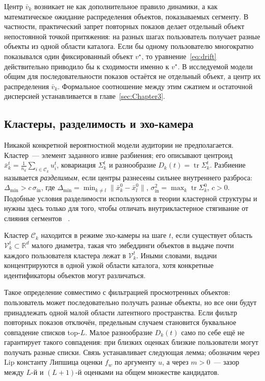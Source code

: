 Центр $\bar v_k$ возникает не как дополнительное правило динамики, а как
математическое ожидание распределения объектов, показываемых сегменту. В
частности, практический запрет повторных показов делает отдельный объект
непостоянной точкой притяжения: на разных шагах пользователь получает разные
объекты из одной области каталога. Если бы одному пользователю многократно
показывался один фиксированный объект $v^\star$, то
уравнение~\eqref{eq:drift} действительно приводило бы к сходимости именно к
$v^\star$. В исследуемой модели общим для последовательности показов остаётся
не отдельный объект, а центр их распределения $\bar v_k$. Формальное соотношение
между этим сжатием и остаточной дисперсией устанавливается в
главе~\ref{sec:Chapter3}.

\subsection{Кластеры, разделимость и эхо-камера}
\label{subsec:clusters}

Никакой конкретной вероятностной модели аудитории не предполагается. Кластер~---
элемент заданного извне разбиения; его описывают центроид
$\bar x_k^t=\tfrac1{n_k}\sum_{i\in\mathcal C_k}u_i^t$, ковариация $\Sigma_k^t$ и
разнообразие $D_k(t)=\operatorname{tr}\Sigma_k^t$. Разбиение называется
\emph{разделимым}, если центры разнесены сильнее внутреннего разброса:
$\Delta_{\min}>c\,\sigma_{\mathrm{in}}$, где
$\Delta_{\min}=\min_{k\ne l}\lVert\bar x_k^0-\bar x_l^0\rVert$,
$\sigma_{\mathrm{in}}^2=\max_k\operatorname{tr}\Sigma_k^0$, $c>0$. Подобные
условия разделимости используются в теории кластерной структуры и нужны здесь
только для того, чтобы отличать внутрикластерное стягивание от слияния сегментов
~\cite{hartigan1981, chaudhuri2010}.

\begin{definition}
\label{def:echo}
Кластер $\mathcal C_k$ находится в режиме эхо-камеры на шаге $t$, если существует
область $\mathcal V_k^t\subset\mathbb R^d$ малого диаметра, такая что эмбеддинги
объектов в выдаче почти каждого пользователя кластера лежат в
$\mathcal V_k^t$. Иными словами, выдачи концентрируются в одной узкой области
каталога, хотя конкретные идентификаторы объектов могут различаться.
\end{definition}

Такое определение совместимо с фильтрацией просмотренных объектов:
пользователь может последовательно получать разные объекты, но все они будут
принадлежать одной малой области латентного пространства. Если фильтр повторных
показов отключён, предельным случаем становится буквальное совпадение списков
top-$L$. Малое разнообразие $D_k(t)$ само по себе ещё не гарантирует такого
совпадения: при близких оценках близкие пользователи могут получать разные
списки. Связь устанавливает следующая лемма; обозначим через $\mathrm{Lip}$
константу Липшица оценки $f_w$ по аргументу $u$, а через $m>0$~--- зазор между
$L$-й и $(L{+}1)$-й оценками на общем множестве кандидатов.

